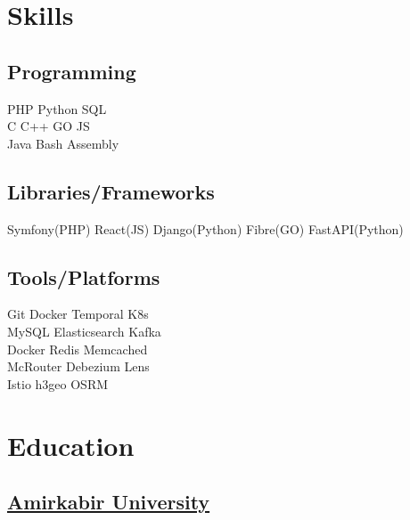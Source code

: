 \documentclass[]{plushcv}
\begin{document}
\begin{minipage}[t]{0.25\textwidth} 


\section{Skills}
\subsection{Programming}
\sectionsep
{}
PHP \textbullet{} Python \textbullet{} SQL \\
\sectionsep
{}
C \textbullet{} C++ \textbullet{}  GO  \textbullet{} JS \\
\sectionsep
{}
Java \textbullet{}  Bash \textbullet{} Assembly \textbullet{} 
\sectionsep
\sectionsep
\subsection{Libraries/Frameworks}
\sectionsep
Symfony(PHP) \textbullet{} React(JS) \textbullet{} Django(Python) \textbullet{} Fibre(GO) \textbullet{} FastAPI(Python)
\sectionsep
\sectionsep
\subsection{Tools/Platforms}
\sectionsep
Git \textbullet{} Docker \textbullet{} Temporal \textbullet K8s \\ MySQL  \textbullet{} Elasticsearch \textbullet{} Kafka \\ Docker \textbullet{} 
Redis \textbullet{} Memcached \\ McRouter \textbullet{} Debezium \textbullet{} Lens\\
Istio \textbullet{} h3geo \textbullet{} OSRM 

\sectionsep


\section{Education} 
\subsection{	\href{https://aut.ac.ir/en}{Amirkabir University}}


\end{minipage}
\end{document}
